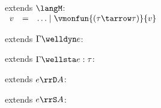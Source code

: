 \begin{flushleft}

 extends $\langM$:\\
$\begin{array}{l c l}
  v & = & \ldots \mid \vmonfun{(\tau\tarrow\tau)}{v}
\end{array}$

\medskip
\begin{minipage}[t]{0.5\textwidth}
 extends $\Gamma \welldyn e$:
\begin{mathpar}
\end{mathpar}
\end{minipage}%
\begin{minipage}[t]{0.5\textwidth}
 extends $\Gamma \wellsta e : \tau$:
\begin{mathpar}
\end{mathpar}
\end{minipage}

\medskip
\begin{minipage}[t]{0.5\textwidth}
 extends $e \rrD A$:
\begin{mathpar}
\end{mathpar}
\end{minipage}%
\begin{minipage}[t]{0.5\textwidth}
 extends $e \rrS A$:
\begin{mathpar}
\end{mathpar}
\end{minipage}%

\medskip
{}
\begin{mathpar}



\end{mathpar}
\end{flushleft}
